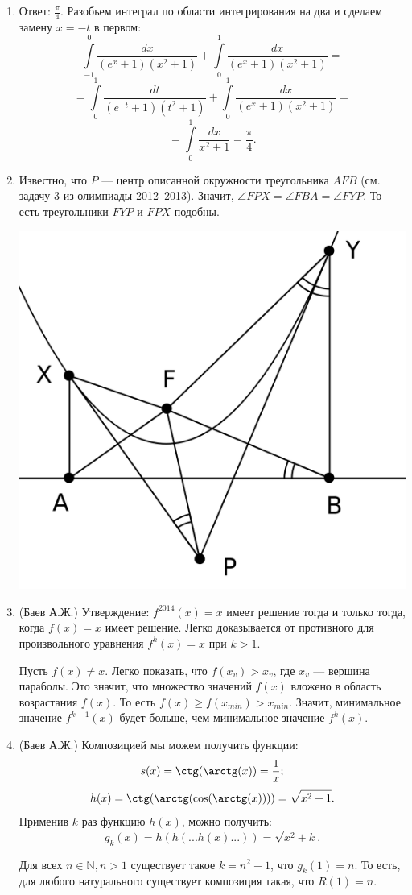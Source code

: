 \documentclass[12pt, a4paper]{article}
\begin{document}
\begin{enumerate}
\item Ответ: $\frac{\pi}{4}$. Разобьем интеграл по области интегрирования на два и сделаем замену $x = -t$ в первом:
$$\int\limits_{-1}^{0} \frac{dx}{(e^x + 1)(x^2 + 1)} + \int\limits_{0}^{1} \frac{dx}{(e^x + 1)(x^2 + 1)} = $$
$$= \int\limits_{0}^{1} \frac{dt}{(e^{-t}+ 1)(t^2 + 1)} + \int\limits_{0}^{1} \frac{dx}{(e^x + 1)(x^2 + 1)} = $$
$$= \int\limits_{0}^{1} \frac{dx}{x^2 + 1} = \frac{\pi}{4}.$$

\item Известно, что $P$ --- центр описанной окружности треугольника $AFB$ (см. задачу 3 из олимпиады 2012--2013). Значит, $\angle FPX = \angle FBA = \angle FYP$. То есть треугольники $FYP$  и $FPX$ подобны.
\begin{center}
\includegraphics[width=0.5\linewidth]{pictures/2013-2014-bonus-6}
\end{center}

\item (Баев А.Ж.) Утверждение: $f^{2014}(x) = x$ имеет решение тогда и только тогда, когда $f(x) = x$ имеет решение. Легко доказывается от противного для произвольного уравнения $f^k(x) = x$ при $k>1$.

Пусть $f(x) \neq x$. Легко показать, что $f(x_v) > x_v$, где $x_v$ --- вершина параболы. Это значит, что множество значений $f(x)$ вложено в область возрастания $f(x)$. То есть $f(x) \geqslant f(x_{min}) > x_{min}$. Значит, минимальное значение $f^{k+1}(x)$ будет больше, чем минимальное значение $f^{k}(x)$.

\item (Баев А.Ж.) Композицией мы можем получить функции:
$$s(x) = \ctg (\arctg (x) ) = \frac{1}{x};$$
$$h(x) = \ctg (\arctg ( \cos ( \arctg(x) ) ) ) = \sqrt{x^2+1}.$$
Применив $k$ раз функцию $h(x)$, можно получить:
$$g_k(x) = h(h( ... h(x) ... )) = \sqrt{x^2 + k}.$$

Для всех $n \in \mathbb{N}, n > 1$ существует такое $k = n^2-1$, что $g_k(1) = n$. То есть, для любого натурального существует композиция такая, что  $R(1) = n$.


\end{enumerate}
\end{document}

